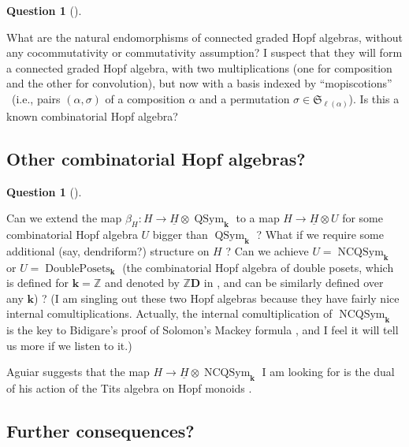 \documentclass[numbers=enddot,12pt,final,onecolumn,notitlepage,abstracton]{scrartcl}%
\theoremstyle{definition}
\newtheorem{quest}[theo]{Question}
\newenvironment{question}[1][]
{\begin{quest}[#1]\begin{leftbar}}
{\end{leftbar}\end{quest}}
\newenvironment{question}[1][Question]{\noindent\textbf{#1.} }{\ \rule{0.5em}{0.5em}}
\begin{document}
\begin{question}
\label{quest.noncocomm}What are the natural endomorphisms of connected graded
Hopf algebras, without any cocommutativity or commutativity assumption? I
suspect that they will form a connected graded Hopf algebra, with two
multiplications (one for composition and the other for convolution), but now
with a basis indexed by \textquotedblleft mopiscotions\textquotedblright%
\ (i.e., pairs $\left(  \alpha,\sigma\right)  $ of a composition $\alpha$ and
a permutation $\sigma\in\mathfrak{S}_{\ell\left(  \alpha\right)  }$). Is this
a known combinatorial Hopf algebra?
\end{question}

\subsection{Other combinatorial Hopf algebras?}

\begin{question}
\label{quest.bigger}Can we extend the map $\beta_{H}:H\rightarrow
\underline{H}\otimes\operatorname*{QSym}\nolimits_{\mathbf{k}}$ to a map
$H\rightarrow\underline{H}\otimes U$ for some combinatorial Hopf algebra $U$
bigger than $\operatorname*{QSym}\nolimits_{\mathbf{k}}$ ? What if we require
some additional (say, dendriform?) structure on $H$ ? Can we achieve
$U=\operatorname*{NCQSym}\nolimits_{\mathbf{k}}$ or
$U=\operatorname*{DoublePosets}\nolimits_{\mathbf{k}}$ (the combinatorial Hopf
algebra of double posets, which is defined for $\mathbf{k}=\mathbb{Z}$ and
denoted by $\mathbb{Z}\mathbf{D}$ in \cite{Mal-Reu-DP}, and can be similarly
defined over any $\mathbf{k}$) ? (I am singling out these two Hopf algebras
because they have fairly nice internal comultiplications. Actually, the
internal comultiplication of $\operatorname*{NCQSym}\nolimits_{\mathbf{k}}$ is
the key to Bidigare's proof of Solomon's Mackey formula \cite[\S 2]{Schocker},
and I feel it will tell us more if we listen to it.)

Aguiar suggests that the map $H\rightarrow\underline{H}\otimes
\operatorname*{NCQSym}\nolimits_{\mathbf{k}}$ I am looking for is the dual of
his action of the Tits algebra on Hopf monoids \cite[Proposition 88]{Aguiar13}.
\end{question}

\subsection{Further consequences?}
\end{document}
